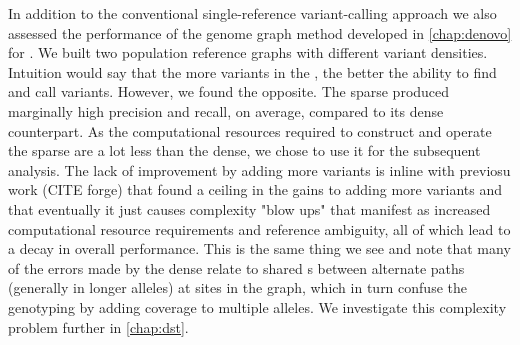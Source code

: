 In addition to the conventional single-reference variant-calling approach we also assessed the performance of the genome graph method developed in \autoref{chap:denovo} for \mtb{}. We built two \mtb{} population reference graphs with different variant densities. Intuition would say that the more variants in the \prg{}, the better the ability to find and call variants. However, we found the opposite. The sparse \prg{} produced marginally high precision and recall, on average, compared to its dense counterpart. As the computational resources required to construct and operate the sparse \prg{} are a lot less than the dense, we chose to use it for the subsequent analysis. The lack of improvement by adding more variants is inline with previosu work (CITE forge) that found a ceiling in the gains to adding more variants and that eventually it just causes complexity "blow ups" that manifest as increased computational resource requirements and reference ambiguity, all of which lead to a decay in overall performance. This is the same thing we see and note that many of the errors made by the dense \prg{} relate to shared \kmer{}s between alternate paths (generally in longer alleles) at sites in the graph, which in turn confuse the genotyping by adding coverage to multiple alleles. We investigate this complexity problem further in \autoref{chap:dst}.

